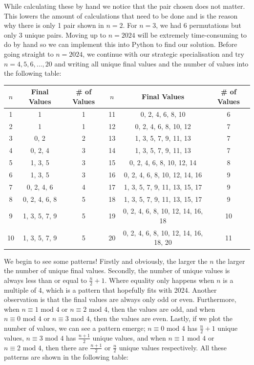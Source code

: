 \documentclass[11pt]{article}
\newcommand{\keywordfont}{\textsc}
\newcommand{\keyword}[1]{%
  \marginpar{\raggedright\small\keywordfont{#1}}}
\begin{document}
 While calculating these by hand we notice that the pair chosen does not matter. This lowers the amount of calculations that need to be done and is the reason why there is only 1 pair shown in $n=2$. For $n=3$, we had 6 permutations but only 3 unique pairs. Moving up to $n=2024$ \keyword{Stuck} will be extremely time-consuming to do by hand so we can implement this into Python to find our solution. Before going straight to $n=2024$, we continue with our \keyword{Try} strategic specialisation and try $n=4,5,6,\dots,20$ and writing all unique final values and the number of values into the following table:

\begin{table}[h]
    \centering
    \begin{tabular}{c|c|c|c|c|c} 
         $n$&  Final Values&  \# of Values&  $n$&  Final Values& \# of Values\\ 
         \hline
         1&  1&  1&  11&  0, 2, 4, 6, 8, 10& 6\\ 
         2&  1&  1&  12&  0, 2, 4, 6, 8, 10, 12& 7\\ 
         3&  0, 2&  2&  13&  1, 3, 5, 7, 9, 11, 13& 7\\ 
         4&  0, 2, 4&  3&  14&  1, 3, 5, 7, 9, 11, 13& 7\\ 
         5&  1, 3, 5 &  3&  15&  0, 2, 4, 6, 8, 10, 12, 14& 8\\ 
         6&  1, 3, 5&  3&  16&  0, 2, 4, 6, 8, 10, 12, 14, 16& 9\\ 
         7&  0, 2, 4, 6&  4&  17&  1, 3, 5, 7, 9, 11, 13, 15, 17& 9\\ 
         8&  0, 2, 4, 6, 8&  5&  18&  1, 3, 5, 7, 9, 11, 13, 15, 17& 9\\ 
         9&  1, 3, 5, 7, 9&  5&  19&  0, 2, 4, 6, 8, 10, 12, 14, 16, 18& 10\\
        10&  1, 3, 5, 7, 9& 5& 20& 0, 2, 4, 6, 8, 10, 12, 14, 16, 18, 20& 11\\ 
    \end{tabular}
\end{table}

We begin to \keyword{AHA} see some patterns! Firstly and obviously, the larger the $n$ the larger the number of unique final values. Secondly, the number of unique values is always less than or equal to $\frac{n}{2}+1$. Where equality only happens when $n$ is a multiple of 4, which is a pattern that hopefully fits with 2024.  Another observation is that the final values are always only odd or even. Furthermore, when $n \equiv 1 \text{ mod } 4$ or $n \equiv 2 \text{ mod } 4$, then the values are odd, and when  $n \equiv 0 \text{ mod } 4$ or  $n \equiv 3 \text{ mod } 4$, then the values are even. Lastly, if we plot the number of values, we can see a pattern emerge; $n \equiv 0 \text{ mod } 4$ has $\frac{n}{2}+1$ unique values, $n \equiv 3 \text{ mod } 4$ has $\frac{n + 1}{2}$ unique values, and when  $n \equiv 1 \text{ mod } 4$ or $n \equiv 2 \text{ mod } 4$, then there are $\frac{n + 1}{2}$ or $\frac{n}{2}$ unique values respectively. All these patterns \keyword{Generalise} are shown in the following table:
\end{document}
